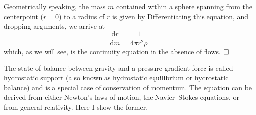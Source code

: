 \begin{description}%
    \setlength{\itemindent}{0pt}
    \item[Conservation of Mass.]
    Geometrically speaking, the mass $m$ contained within a sphere spanning from the centerpoint (${r=0}$) to a radius of $r$ is given by 
    Differentiating this equation, and dropping arguments, we arrive at 
    \begin{equation} \label{eq:cons-mass} \boxed{
        \frac{\text{d}r}{\text{d}m}
        =
        \frac{1}{4\pi r^2\rho}
    }\end{equation}
    which, as we will see, is the continuity equation in the absence of flows. $\hfill\square\;$
    
    \item[Conservation of Momentum.] 
    The state of balance between gravity and a pressure-gradient force is called hydrostatic support (also known as hydrostatic equilibrium or hydrostatic balance) and is a special case of conservation of momentum. 
    The equation can be derived from either Newton's laws of motion, the Navier--Stokes equations, or from general relativity. 
    Here I show the former. 
    

\end{description}
